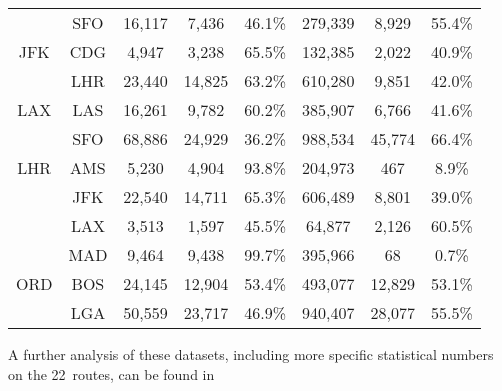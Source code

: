 \begin{center}
\begin{tabular}{c c | c c c | c | c c}
~  &  SFO  &  16,117  &  7,436  &  46.1\%  &  279,339  &  8,929  &  55.4\% \\[.5ex]
JFK  &  CDG  &  4,947  &  3,238  &  65.5\%  &  132,385  &  2,022  &  40.9\% \\
~  &  LHR  &  23,440  &  14,825  &  63.2\%  &  610,280  &  9,851  &  42.0\% \\[.5ex]
LAX  &  LAS  &  16,261  &  9,782  &  60.2\%  &  385,907  &  6,766  &  41.6\% \\
~  &  SFO  &  68,886  &  24,929  &  36.2\%  &  988,534  &  45,774  &  66.4\% \\[.5ex]
LHR  &  AMS  &  5,230  &  4,904  &  93.8\%  &  204,973  &  467  &  8.9\% \\
~  &  JFK  &  22,540  &  14,711  &  65.3\%  &  606,489  &  8,801  &  39.0\% \\
~  &  LAX  &  3,513  &  1,597  &  45.5\%  &  64,877  &  2,126  &  60.5\% \\
~  &  MAD  &  9,464  &  9,438  &  99.7\%  &  395,966  &  68  &  0.7\% \\[.5ex]
ORD  &  BOS  &  24,145  &  12,904  &  53.4\%  &  493,077  &  12,829  &  53.1\% \\
~  &  LGA  &  50,559  &  23,717  &  46.9\%  &  940,407  &  28,077  &  55.5\% \\
\bottomrule
\end{tabular}
\end{center}



A further analysis of these datasets, including more specific statistical numbers on the 22~routes, can be found in 










